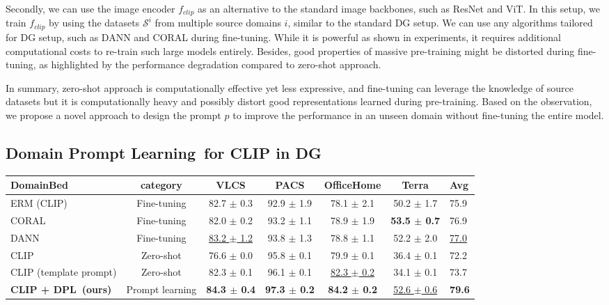 \documentclass[letterpaper]{article} \usepackage[]{aaai23}
\newcommand{\dplshort}{DPL}
\newcommand{\dpllong}{Domain Prompt Learning}
\begin{document}
Secondly, we can use the image encoder $f_{clip}$ as an alternative to the standard image backbones, such as ResNet and ViT. 
In this setup, we train $f_{clip}$ by using the datasets $\mathcal{S}^{i}$ from multiple source domains $i$, similar to the standard DG setup. 
We can use any algorithms tailored for DG setup, such as DANN and CORAL during fine-tuning. 
While it is powerful as shown in experiments, it requires additional computational costs to re-train such large models entirely. 
Besides, good properties of massive pre-training might be distorted during fine-tuning, as highlighted by the performance degradation compared to zero-shot approach. 

In summary, zero-shot approach is computationally effective yet less expressive, and fine-tuning can leverage the knowledge of source datasets but it is computationally heavy and possibly distort good representations learned during pre-training. 
Based on the observation, we propose a novel approach to design the prompt $p$ to improve the performance in an unseen domain without fine-tuning the entire model. 

\subsection{\dpllong~for CLIP in DG}


\begin{table*}[h]
\begin{center}
\begin{tabular}{lc|cccc|l}
\toprule
\textbf{DomainBed} & category & \textbf{VLCS} & \textbf{PACS} & \textbf{OfficeHome} & \textbf{Terra} & \textbf{Avg} \\
\midrule
ERM (CLIP) & Fine-tuning & 82.7 $\pm$ 0.3 & 92.9 $\pm$ 1.9 & 78.1 $\pm$ 2.1 & 50.2 $\pm$ 1.7 & 75.9\\
CORAL & Fine-tuning & 82.0 $\pm$ 0.2 & 93.2 $\pm$ 1.1 & 78.9 $\pm$ 1.9 & \textbf{53.5 $\pm$ 0.7} & 76.9 \\
DANN & Fine-tuning & \underline{83.2 $\pm$ 1.2} & 93.8 $\pm$ 1.3 & 78.8 $\pm$ 1.1 & 52.2 $\pm$ 2.0 & \underline{77.0} \\
\midrule
CLIP & Zero-shot & 76.6 $\pm$ 0.0 & 95.8 $\pm$ 0.1 & 79.9 $\pm$ 0.1 & 36.4 $\pm$ 0.1 & 72.2  \\
CLIP (template prompt)& Zero-shot & 82.3 $\pm$ 0.1 & 96.1 $\pm$ 0.1 & \underline{82.3 $\pm$ 0.2} & 34.1 $\pm$ 0.1 & 73.7 \\
\textbf{CLIP + \dplshort~(ours)}& Prompt learning & \textbf{84.3 $\pm$ 0.4} & \textbf{97.3 $\pm$ 0.2} & \textbf{84.2 $\pm$ 0.2} & \underline{52.6 $\pm$ 0.6} & \textbf{79.6} \\
\midrule
\end{tabular}
\caption{
Comparison experiments on VLCS, PACS, OfficeHome, and TerraIncognita. 
The best results are in bold, and the second-best results are underlined.
CLIP (standard template) indicates using `a photo of a \{class name\}' prompt.
Following the experiment setup in~\cite{iwasawa2021testtime}, reported results are the mean and std with seed=\{1, 2, 3\}.
}
\label{table:main_dg}
\end{center}
\end{table*}
\end{document}
